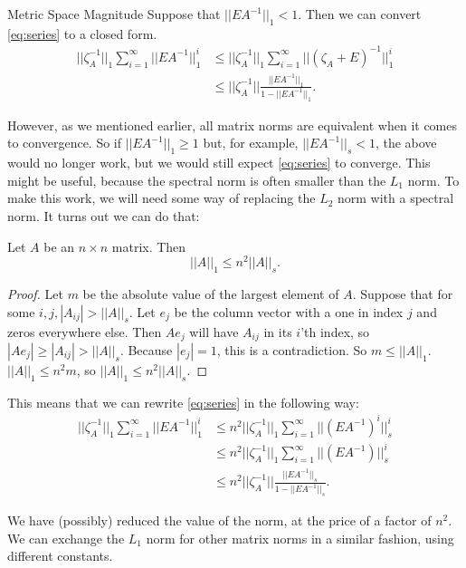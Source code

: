 \documentclass[12pt]{pom_thesis}
\begin{document}
\begin{chapter}{Metric Space Magnitude}
Suppose that $||EA^{-1}||_1 <1$. Then we can convert \eqref{eq:series} to a closed form. 
\begin{align*}
||\zeta_A^{-1}||_1\sum_{i = 1}^\infty ||EA^{-1}||_1^i &\leq
||\zeta_A^{-1}||_1 \sum_{i = 1}^\infty||(\zeta_A + E)^{-1}||_1^i\\
 &\leq ||\zeta_A^{-1}||\frac{||EA^{-1}||_1}{1-||EA^{-1}||_1}.
\end{align*}

However, as we mentioned earlier, all matrix norms are equivalent when it comes to convergence. So if $||EA^{-1}||_1 \geq 1$ but, for example, $||EA^{-1}||_s <1$, the above would no longer work, but we would still expect \eqref{eq:series} to converge. This might be useful, because the spectral norm is often smaller than the $L_1$ norm. To make this work, we will need some way of replacing the $L_2$ norm with a spectral norm. It turns out we can do that:
\begin{lemma}\label{lem:norm_switch}
Let $A$ be an $n \times n$ matrix. Then
\[
||A||_1 \leq n^2||A||_s.
\]
\end{lemma}
\begin{proof}
Let $m$ be the absolute value of the largest element of $A$. Suppose that for some $i,j, |A_{ij}| > ||A||_s$. Let $e_j$ be the column vector with a one in index $j$ and zeros everywhere else. Then $Ae_j$ will have $A_{ij}$ in its $i$'th index, so $|Ae_j| \geq |A_{ij}| >||A||_s$. Because $|e_j|=1$, this is a contradiction. So $m \leq ||A||_1$. $||A||_1 \leq n^2m$, so $||A||_1 \leq n^2||A||_s$.
\end{proof}

This means that we can rewrite \eqref{eq:series} in the following way:
\begin{align*}
||\zeta_A^{-1}||_1\sum_{i = 1}^\infty ||EA^{-1}||_1^i &\leq n^2||\zeta_A^{-1}||_1\sum_{i = 1}^\infty ||(EA^{-1})^i||_s^i\\
&\leq n^2||\zeta_A^{-1}||_1\sum_{i = 1}^\infty ||(EA^{-1})||_s^i\\
&\leq n^2||\zeta_A^{-1}||\frac{||EA^{-1}||_s}{1-||EA^{-1}||_s}.
\end{align*}

We have (possibly) reduced the value of the norm, at the price of a factor of $n^2$. We can exchange the $L_1$ norm for other matrix norms in a similar fashion, using different constants.


\end{chapter}
\end{document}
